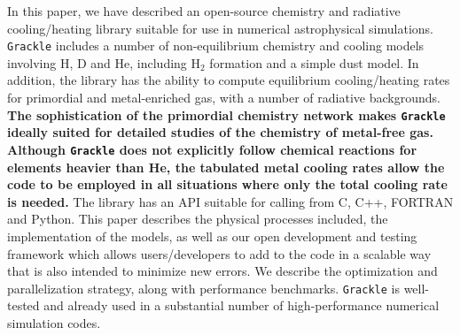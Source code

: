 In this paper, we have described an open-source chemistry and
radiative cooling/heating library suitable for use in numerical
astrophysical simulations.  \texttt{Grackle} includes a number of
non-equilibrium chemistry and cooling models involving H, D and He,
including H$_2$ formation and a simple dust model.  In addition, the
library has the ability to compute equilibrium cooling/heating rates
for primordial and metal-enriched gas, with a number of radiative
backgrounds.  {\bf The sophistication of the primordial chemistry network
makes \texttt{Grackle} ideally suited for detailed studies of the
chemistry of metal-free gas.  Although \texttt{Grackle} does not
explicitly follow chemical reactions for elements heavier than He,
the tabulated metal cooling rates allow the code to be employed in all
situations where only the total cooling rate is needed.}
The library has an API suitable for calling from C, C++,
FORTRAN and Python.  This paper describes the physical processes
included, the implementation of the models, as well as our open
development and testing framework which allows users/developers to add
to the code in a scalable way that is also intended to minimize new
errors.  We describe the optimization and parallelization strategy,
along with performance benchmarks.  \texttt{Grackle} is well-tested and already
used in a substantial number of high-performance numerical simulation
codes.



